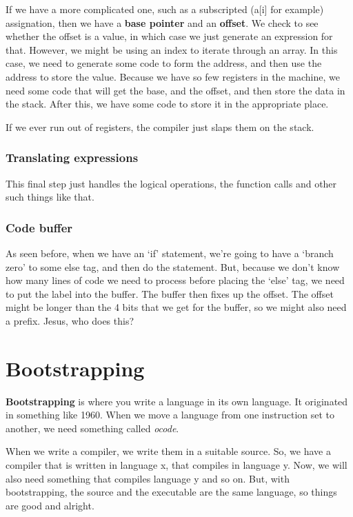 \documentclass[11pt,a4paper,titlepage,dvipsnames,cmyk]{scrartcl}
\begin{document}
If we have a more complicated one, such as a subscripted (a[i] for
example) assignation, then we have a \textbf{base pointer} and an
\textbf{offset}. We check to see whether the offset is a value, in which
case we just generate an expression for that. However, we might be using
an index to iterate through an array. In this case, we need to generate
some code to form the address, and then use the address to store the
value. Because we have so few registers in the machine, we need some code
that will get the base, and the offset, and then store the data in the
stack. After this, we have some code to store it in the appropriate place.

If we ever run out of registers, the compiler just slaps them on the
stack.

\subsubsection{Translating expressions}%
\label{ssub:expressoins}
This final step just handles the logical operations, the function calls
and other such things like that.

\subsubsection{Code buffer}%
\label{ssub:buffer}
As seen before, when we have an `if' statement, we're going to have a
`branch zero' to some else tag, and then do the statement. But, because we
don't know how many lines of code we need to process before placing the
`else' tag, we need to put the label into the buffer. The buffer then
fixes up the offset. The offset might be longer than the 4 bits that we
get for the buffer, so we might also need a prefix. Jesus, who does this?

\section{Bootstrapping}%
\label{sec:changing-sets}
\textbf{Bootstrapping} is where you write a language in its own language.
It originated in something like 1960. When we move a language from one
instruction set to another, we need something called \textit{ocode}.

When we write a compiler, we write them in a suitable source. So, we have
a compiler that is written in language x, that compiles in language y.
Now, we will also need something that compiles language y and so on. But,
with bootstrapping, the source and the executable are the same language,
so things are good and alright.
\end{document}
